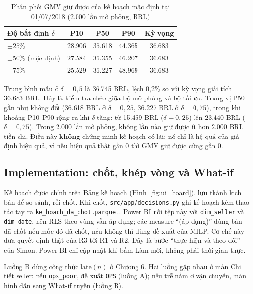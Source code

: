 \begin{table}[htbp]
\centering
\small
\caption{Phân phối GMV giữ được của kế hoạch mặc định tại 01/07/2018 (2.000 lần mô phỏng, BRL)}
\label{tab:mc}
\begin{tabularx}{\textwidth}{|>{\raggedright\arraybackslash}m{3.6cm}|C|C|C|C|}
\hline
\textbf{Độ bất định $\delta$} & \textbf{P10} & \textbf{P50} & \textbf{P90} & \textbf{Kỳ vọng} \\
\hline
$\pm 25\%$ & 28.906 & 36.618 & 44.365 & 36.683 \\
\hline
$\pm 50\%$ (mặc định) & 27.584 & 36.355 & 46.207 & 36.683 \\
\hline
$\pm 75\%$ & 25.529 & 36.227 & 48.969 & 36.683 \\
\hline
\end{tabularx}
\end{table}

Trung bình mẫu ở $\delta = 0{,}5$ là 36.745 BRL, lệch 0,2\% so với kỳ vọng giải tích 36.683 BRL. Đây là kiểm tra chéo giữa bộ mô phỏng và bộ tối ưu. Trung vị P50 gần như không đổi (36.618 BRL ở $\delta = 0{,}25$, 36.227 BRL ở $\delta = 0{,}75$), trong khi khoảng P10--P90 rộng ra khi $\delta$ tăng: từ 15.459 BRL ($\delta = 0{,}25$) lên 23.440 BRL ($\delta = 0{,}75$). Trong 2.000 lần mô phỏng, không lần nào giữ được ít hơn 2.000 BRL tiền chi. Điều này \textbf{không} chứng minh kế hoạch có lãi: nó chỉ là hệ quả của giả định hiệu quả, vì nếu hiệu quả thật gần 0 thì GMV giữ được cũng gần 0.

\subsection{Implementation: chốt, khép vòng và What-if}
Kế hoạch được chỉnh trên Bảng kế hoạch (Hình~\ref{fig:ui_board}), lưu thành kịch bản để so sánh, rồi chốt. Khi chốt, \texttt{src/app/decisions.py} ghi kế hoạch kèm thao tác tay ra \texttt{ke\_hoach\_da\_chot.parquet}. Power BI nối tệp này với \texttt{dim\_seller} và \texttt{dim\_date}, nên RLS theo vùng vẫn áp dụng; các measure ``(áp dụng)'' dùng bản đã chốt nếu mốc đó đã chốt, nếu không thì dùng đề xuất của MILP. Cơ chế này đưa quyết định thật của R3 tới R1 và R2. Đây là bước ``thực hiện và theo dõi'' của Simon. Power BI chỉ cập nhật khi bấm Làm mới, không phải thời gian thực.

Luồng B dùng công thức $\text{late}(n)$ ở Chương 6. Hai luồng gặp nhau ở màn Chi tiết seller: nếu \texttt{ops\_poor}, đề xuất \texttt{OPS} (luồng A); nếu trễ nằm ở vận chuyển, màn hình dẫn sang What-if tuyến (luồng B).

